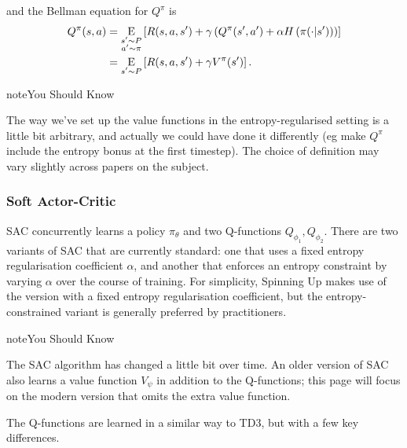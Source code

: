 \documentclass[letterpaper,10pt,english]{sphinxmanual}
\newcommand{\E}{{\mathrm E}}
\newcommand{\underE}[2]{\underset{\begin{subarray}{c}#1 \end{subarray}}{\E}\left[ #2 \right]}
\begin{document}
and the Bellman equation for \(Q^{\pi}\) is
\begin{equation*}
\begin{split}Q^{\pi}(s,a) &= \underE{s' \sim P \\ a' \sim \pi}{R(s,a,s') + \gamma\left(Q^{\pi}(s',a') + \alpha H\left(\pi(\cdot|s')\right) \right)} \\
&= \underE{s' \sim P}{R(s,a,s') + \gamma V^{\pi}(s')}.\end{split}
\end{equation*}
\begin{sphinxadmonition}{note}{You Should Know}

The way we’ve set up the value functions in the entropy-regularised setting is a little bit arbitrary, and actually we could have done it differently (eg make \(Q^{\pi}\) include the entropy bonus at the first timestep). The choice of definition may vary slightly across papers on the subject.
\end{sphinxadmonition}


\subsubsection{Soft Actor-Critic}
\label{\detokenize{algorithms/sac:id1}}
SAC concurrently learns a policy \(\pi_{\theta}\) and two Q-functions \(Q_{\phi_1}, Q_{\phi_2}\). There are two variants of SAC that are currently standard: one that uses a fixed entropy regularisation coefficient \(\alpha\), and another that enforces an entropy constraint by varying \(\alpha\) over the course of training. For simplicity, Spinning Up makes use of the version with a fixed entropy regularisation coefficient, but the entropy-constrained variant is generally preferred by practitioners.

\begin{sphinxadmonition}{note}{You Should Know}

The SAC algorithm has changed a little bit over time. An older version of SAC also learns a value function \(V_{\psi}\) in addition to the Q-functions; this page will focus on the modern version that omits the extra value function.
\end{sphinxadmonition}

 The Q-functions are learned in a similar way to TD3, but with a few key differences.
\end{document}
